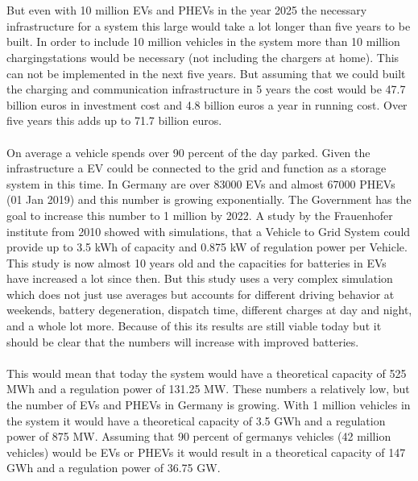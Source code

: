 \begin{parcolumns}[colwidths={1=2.5 cm, 2=10 cm, 3=2.5cm}]{3}
{\\ \\
But even with 10 million EVs and PHEVs in the year 2025 the necessary infrastructure for a system this large would take a lot longer than five years to be built. In order to include 10 million vehicles in the system more than 10 million chargingstations would be necessary (not including the chargers at home). This can not be implemented in the next five years. But assuming that we could built the charging and communication infrastructure in 5 years the cost would be 47.7 billion euros in investment cost and 4.8 billion euros a year in running cost. Over five years this adds up to 71.7 billion euros.
\\ \\
\noindent
On average a vehicle spends over 90 percent of the day parked. Given the infrastructure a EV could be connected to the grid and function as a storage system in this time. In Germany are over 83000 EVs and almost 67000 PHEVs (01 Jan 2019)
and this number is growing exponentially. The Government has the goal to increase this number to 1 million by 2022.
A study by the Frauenhofer institute from 2010 showed with simulations, that a Vehicle to Grid System could provide up to 3.5 kWh of capacity and 0.875 kW of regulation power per Vehicle. This study is now almost 10 years old and the capacities for batteries in EVs have increased a lot since then. But this study uses a very complex simulation which does not just use averages but accounts for different driving behavior at weekends, battery degeneration, dispatch time, different charges at day and night, and a whole lot more. Because of this its results are still viable today but it should be clear that the numbers will increase with improved batteries.
\\ \\
This would mean that today the system would have a theoretical capacity of 525 MWh and a regulation power of 131.25 MW. These numbers a relatively low, but the number of EVs and PHEVs in Germany is growing. With 1 million vehicles in the system it would have a theoretical capacity of 3.5 GWh and a regulation power of 875 MW. Assuming that 90 percent of germanys vehicles (42 million vehicles) would be EVs or PHEVs it would result in a theoretical capacity of 147 GWh and a regulation power of 36.75 GW.
}
\end{parcolumns}
